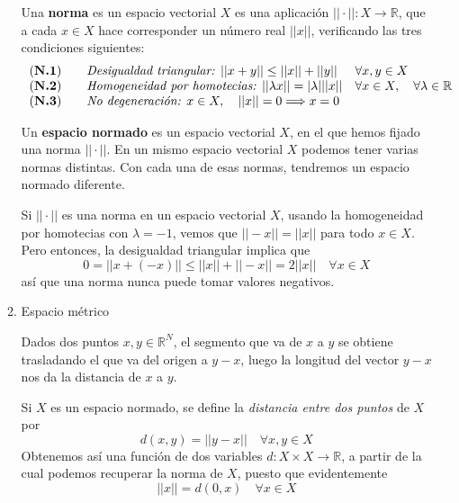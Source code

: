 \documentclass[a4paper, 12pt]{article}
\begin{document}
\begin{enumerate}[label=\textbf{\arabic*}.]
\begin{enumerate}[label=\textit{\alph*})]
Una \textbf{norma} es un espacio vectorial \(X\) es una aplicación \(|| \cdot || : X \rightarrow \mathbb{R}\), que a cada \(x \in X\) hace corresponder un número real \(||x||\), verificando las tres condiciones siguientes:
\[
\begin{array}{lll}
\text{(\textbf{N.1})} \quad & \textit{Desigualdad triangular: }||x+y|| \leq ||x|| + ||y||  & \forall x,y \in X \\
\text{(\textbf{N.2})} \quad & \textit{Homogeneidad por homotecias: }||\lambda x|| = |\lambda| ||x|| & \forall x \in X, \quad \forall \lambda \in \mathbb{R} \\
\text{(\textbf{N.3})} \quad & \textit{No degeneración: } x \in X, \quad ||x|| = 0 \Longrightarrow x = 0 
\end{array}
\]

Un \textbf{espacio normado} es un espacio vectorial \(X\), en el que hemos fijado una norma \(|| \cdot ||\). En un mismo espacio vectorial \(X\) podemos tener varias normas distintas. Con cada una de esas normas, tendremos un espacio normado diferente.

Si \(|| \cdot ||\) es una norma en un espacio vectorial \(X\), usando la homogeneidad por homotecias con \(\lambda = -1\), vemos que \(||-x|| = ||x||\) para todo \(x \in X\). Pero entonces, la desigualdad triangular implica que
\[
	0 = || x + (-x)|| \leq ||x|| + ||-x|| = 2||x|| \quad \forall x \in X
\]
así que una norma nunca puede tomar valores negativos.

\medskip

	\item Espacio métrico

Dados dos puntos \(x,y \in \mathbb{R}^N\), el segmento que va de \(x\) a \(y\) se obtiene trasladando el que va del origen a \(y-x\), luego la longitud del vector \(y-x\) nos da la distancia de \(x\) a \(y\). 

Si \(X\) es un espacio normado, se define la \textit{distancia entre dos puntos } de \(X\) por
\begin{equation}\label{distancia}
	d(x,y) = || y-x || \quad \forall x,y \in X
\end{equation}
Obtenemos así una función de dos variables \(d: X \times X \rightarrow \mathbb{R}\), a partir de la cual podemos recuperar la norma de \(X\), puesto que evidentemente
\begin{equation}
	||x|| = d(0,x) \quad \forall x \in X
\end{equation}


\end{enumerate}
\end{enumerate}
\end{document}
